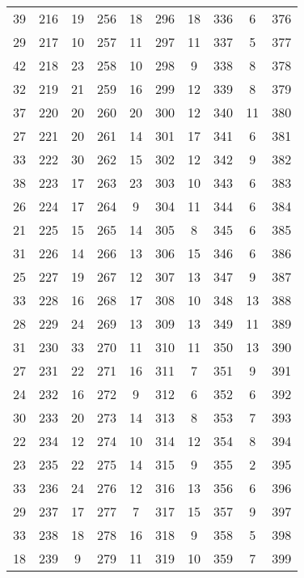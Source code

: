 \begin{table}
\begin{tabular}{c c || c c || c c || c c || c c}
39      &216 & 19   &   256  & 18      &     296  &   18      &  336 & 6        & 376 \\  
29      &217 & 10   &   257  & 11      &     297  &   11      &  337 & 5        & 377 \\  
42      &218 & 23   &   258  & 10      &     298  &   9       &  338 & 8        & 378 \\  
32      &219 & 21   &   259  & 16      &     299  &   12      &  339 & 8        & 379 \\  
37      &220 & 20   &   260  & 20      &     300  &   12      &  340 & 11       & 380 \\  
27      &221 & 20   &   261  & 14      &     301  &   17      &  341 & 6        & 381 \\  
33      &222 & 30   &   262  & 15      &     302  &   12      &  342 & 9        & 382 \\  
38      &223 & 17   &   263  & 23      &     303  &   10      &  343 & 6        & 383 \\  
26      &224 & 17   &   264  & 9       &     304  &   11      &  344 & 6        & 384 \\  
21      &225 & 15   &   265  & 14      &     305  &   8       &  345 & 6        & 385 \\  
31      &226 & 14   &   266  & 13      &     306  &   15      &  346 & 6        & 386 \\  
25      &227 & 19   &   267  & 12      &     307  &   13      &  347 & 9        & 387 \\  
33      &228 & 16   &   268  & 17      &     308  &   10      &  348 & 13       & 388 \\  
28      &229 & 24   &   269  & 13      &     309  &   13      &  349 & 11       & 389 \\  
31      &230 & 33   &   270  & 11      &     310  &   11      &  350 & 13       & 390 \\  
27      &231 & 22   &   271  & 16      &     311  &   7       &  351 & 9        & 391 \\  
24      &232 & 16   &   272  & 9       &     312  &   6       &  352 & 6        & 392 \\  
30      &233 & 20   &   273  & 14      &     313  &   8       &  353 & 7        & 393 \\  
22      &234 & 12   &   274  & 10      &     314  &   12      &  354 & 8        & 394 \\  
23      &235 & 22   &   275  & 14      &     315  &   9       &  355 & 2        & 395 \\  
33      &236 & 24   &   276  & 12      &     316  &   13      &  356 & 6        & 396 \\  
29      &237 & 17   &   277  & 7       &     317  &   15      &  357 & 9        & 397 \\  
33      &238 & 18   &   278  & 16      &     318  &   9       &  358 & 5        & 398 \\  
18      &239 & 9    &   279  & 11      &     319  &   10      &  359 & 7        & 399 \\  
    \end{tabular}
\end{table}


